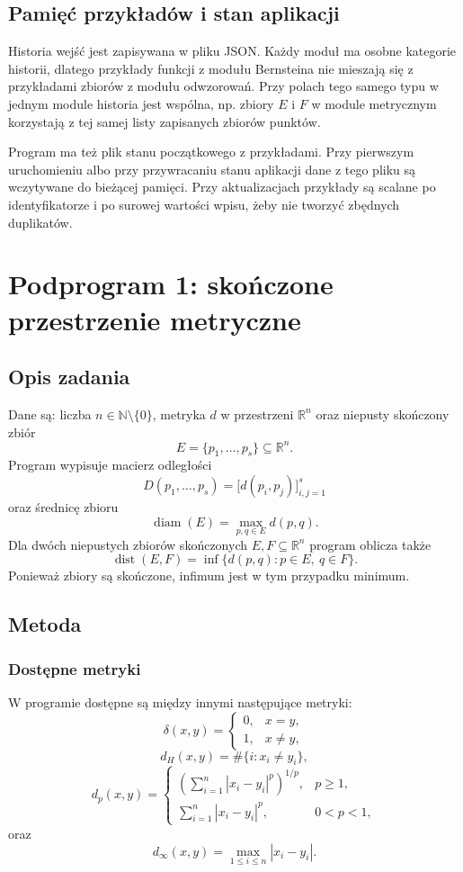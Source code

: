 \documentclass[12pt,a4paper]{article}
\begin{document}
\subsection{Pamięć przykładów i stan aplikacji}

Historia wejść jest zapisywana w pliku JSON. Każdy moduł ma osobne kategorie historii, dlatego przykłady funkcji z modułu Bernsteina nie mieszają się z przykładami zbiorów z modułu odwzorowań. Przy polach tego samego typu w jednym module historia jest wspólna, np. zbiory $E$ i $F$ w module metrycznym korzystają z tej samej listy zapisanych zbiorów punktów.

Program ma też plik stanu początkowego z przykładami. Przy pierwszym uruchomieniu albo przy przywracaniu stanu aplikacji dane z tego pliku są wczytywane do bieżącej pamięci. Przy aktualizacjach przykłady są scalane po identyfikatorze i po surowej wartości wpisu, żeby nie tworzyć zbędnych duplikatów.

\clearpage
\section{Podprogram 1: skończone przestrzenie metryczne}

\subsection{Opis zadania}

Dane są: liczba $n\in\mathbb{N}\setminus\{0\}$, metryka $d$ w przestrzeni $\mathbb{R}^n$ oraz niepusty skończony zbiór
\[
E=\{p_1,\ldots,p_s\}\subseteq\mathbb{R}^n.
\]
Program wypisuje macierz odległości
\[
D(p_1,\ldots,p_s)=\bigl[d(p_i,p_j)\bigr]_{i,j=1}^{s}
\]
oraz średnicę zbioru
\[
\operatorname{diam}(E)=\max_{p,q\in E} d(p,q).
\]
Dla dwóch niepustych zbiorów skończonych $E,F\subseteq\mathbb{R}^n$ program oblicza także
\[
\operatorname{dist}(E,F)=\inf\{d(p,q):p\in E,\ q\in F\}.
\]
Ponieważ zbiory są skończone, infimum jest w tym przypadku minimum.

\subsection{Metoda}

\subsubsection*{Dostępne metryki}

W programie dostępne są między innymi następujące metryki:
\[
\delta(x,y)=
\begin{cases}
0, & x=y,\\
1, & x\neq y,
\end{cases}
\]
\[
d_H(x,y)=\#\{i:x_i\neq y_i\},
\]
\[
d_p(x,y)=
\begin{cases}
\left(\sum_{i=1}^{n}|x_i-y_i|^p\right)^{1/p}, & p\geq 1,\\[0.4em]
\sum_{i=1}^{n}|x_i-y_i|^p, & 0<p<1,
\end{cases}
\]
oraz
\[
d_\infty(x,y)=\max_{1\leq i\leq n}|x_i-y_i|.
\]
\end{document}
